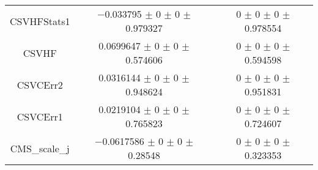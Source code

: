 \begin{table}
\begin{tabular}{ccc}
CSVHFStats1 & \num{-0.033795} $\pm$ \num{0} $\pm$ \num{0} $\pm$ \num{0.979327} & \num{0} $\pm$ \num{0} $\pm$ \num{0} $\pm$ \num{0.978554}\\
CSVHF & \num{0.0699647} $\pm$ \num{0} $\pm$ \num{0} $\pm$ \num{0.574606} & \num{0} $\pm$ \num{0} $\pm$ \num{0} $\pm$ \num{0.594598}\\
CSVCErr2 & \num{0.0316144} $\pm$ \num{0} $\pm$ \num{0} $\pm$ \num{0.948624} & \num{0} $\pm$ \num{0} $\pm$ \num{0} $\pm$ \num{0.951831}\\
CSVCErr1 & \num{0.0219104} $\pm$ \num{0} $\pm$ \num{0} $\pm$ \num{0.765823} & \num{0} $\pm$ \num{0} $\pm$ \num{0} $\pm$ \num{0.724607}\\
CMS\_scale\_j & \num{-0.0617586} $\pm$ \num{0} $\pm$ \num{0} $\pm$ \num{0.28548} & \num{0} $\pm$ \num{0} $\pm$ \num{0} $\pm$ \num{0.323353}\\
\bottomrule
\end{tabular}
\end{table}